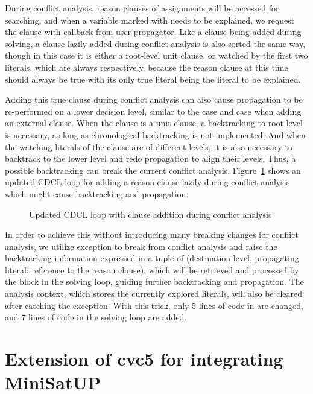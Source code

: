 During conflict analysis, reason clauses of assignments will be accessed for searching, and when a variable marked with  needs to be explained, we request the clause with callback  from user propagator. Like a clause being added during solving, a clause lazily added during conflict analysis is also sorted the same way, though in this case it is either a root-level unit clause, or watched by the first two literals, which are always  respectively, because the reason clause at this time should always be true with its only true literal being the literal to be explained.

Adding this true clause during conflict analysis can also cause propagation to be re-performed on a lower decision level, similar to the  case and  case when adding an external clause. When the clause is a unit clause, a backtracking to root level is necessary, as long as chronological backtracking is not implemented. And when the watching literals of the clause are of different levels, it is also necessary to backtrack to the lower level and redo propagation to align their levels. Thus, a possible backtracking can break the current conflict analysis. Figure~\ref{fig:analyze} shows an updated CDCL loop for adding a reason clause lazily during conflict analysis which might cause backtracking and propagation.

\begin{figure}[!htbp]
  \centering
  
  \caption{Updated CDCL loop with clause addition during conflict analysis}
  \label{fig:analyze}
\end{figure}

In order to achieve this without introducing many breaking changes for conflict analysis, we utilize  exception to break from conflict analysis and raise the backtracking information expressed in a tuple of (destination level, propagating literal, reference to the reason clause), which will be retrieved and processed by the  block in the solving loop, guiding further backtracking and propagation. The analysis context, which stores the currently explored literals, will also be cleared after catching the exception. With this trick, only 5 lines of code in  are changed, and 7 lines of code in the solving loop are added.

\section{Extension of cvc5 for integrating MiniSatUP}

